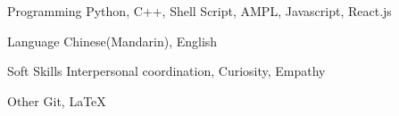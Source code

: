 

\begin{cvskills}

  \cvskill
    {Programming} %
    {Python, C++, Shell Script, AMPL, Javascript, React.js} %
    
  \cvskill
    {Language} %
    {Chinese(Mandarin), English} %
    
  \cvskill
    {Soft Skills} %
    {Interpersonal coordination, Curiosity, Empathy} %
    
  \cvskill
    {Other} %
    {Git, \LaTeX} %

\end{cvskills}
